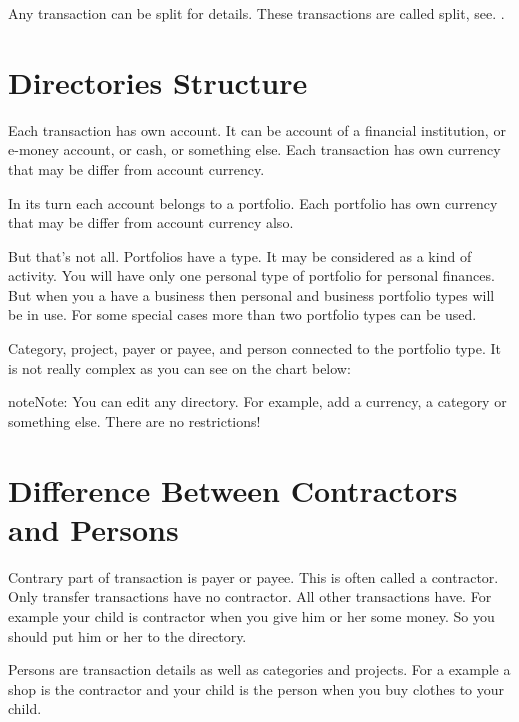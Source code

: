 \documentclass[a4paper,10pt,english]{sphinxmanual}
\begin{document}
Any transaction can be split for details. These transactions are called split, see. {\hyperref[\detokenize{glossary:term-split}]{}}.


\section{Directories Structure}
\label{\detokenize{intro:directories-structure}}
Each transaction has own account. It can be account of a financial institution, or e-money account, or cash,
or something else. Each transaction has own currency that may be differ from account currency.

In its turn each account belongs to a portfolio. Each portfolio has own currency that may be differ from account currency also.

But that’s not all. Portfolios have a type. It may be considered as a kind of activity. You will have only one
personal type of portfolio for personal finances. But when you a have a business then personal and
business portfolio types will be in use. For some special cases more than two portfolio types can be used.

Category, project, payer or payee, and person connected to the portfolio type. It is not really
complex as you can see on the chart below:


\begin{sphinxadmonition}{note}{Note:}
You can edit any directory. For example, add a currency, a category or something else. There are no restrictions!
\end{sphinxadmonition}


\section{Difference Between Contractors and Persons}
\label{\detokenize{intro:difference-between-contractors-and-persons}}
Contrary part of transaction is payer or payee. This is often called a contractor. Only transfer transactions
have no contractor. All other transactions have. For example your child is contractor
when you give him or her some money. So you should put him or her to the  directory.

Persons are transaction details as well as categories and projects. For a example a shop is the contractor
and your child is the person when you buy clothes to your child.
\end{document}
